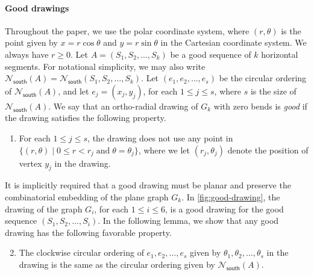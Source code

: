 \documentclass{theoretics}
\newcommand{\Nsouth}{\mathcal{N}_\mathsf{south}}
\begin{document}
\paragraph{Good drawings} Throughout the paper, we use the polar coordinate system, where $(r,\theta)$ is the point given by $x = r \cos{\theta}$ and $y= r \sin{\theta}$ in the Cartesian coordinate system. We always have $r \geq 0$.
Let $A = (S_1, S_2, \ldots, S_{k})$ be a good sequence of $k$ horizontal segments. For notational simplicity, we may also write $\Nsouth(A) = \Nsouth(S_1, S_2, \ldots, S_{k})$. Let $(e_1, e_2, \ldots, e_s)$ be the circular ordering of $\Nsouth(A)$, and let $e_j=(x_j, y_j)$, for each $1 \leq j \leq s$, where $s$ is the size of $\Nsouth(A)$.  We say that an ortho-radial drawing of $G_k$ with zero bends is \emph{good} if the drawing satisfies the following property. 
\begin{enumerate}[(D1)]
\item \label{item:D1} For each $1 \leq j \leq s$, the drawing does not use any point in $\{ (r,\theta) \mid 0\leq r < r_j \; \text{and} \; \theta = \theta_j\}$, where we let $(r_j, \theta_j)$ denote the position of  vertex $y_j$ in the drawing.
\end{enumerate}
It is implicitly required that a good drawing must be planar and preserve the combinatorial embedding of the plane graph $G_k$. In \cref{fig:good-drawing}, the drawing of the graph $G_i$, for each $1 \leq i \leq 6$, is a good drawing for the good sequence $(S_1, S_2, \ldots, S_i)$. In the following lemma, we show that any good drawing has the following favorable property.



\begin{enumerate}[(D1)]\setcounter{enumi}{1}
\item \label{item:D2} The clockwise circular ordering of $e_1, e_2, \ldots, e_s$ given by $\theta_1, \theta_2, \ldots, \theta_s$ in the drawing is the same as the circular ordering given by $\Nsouth(A)$.
\end{enumerate}
\end{document}
